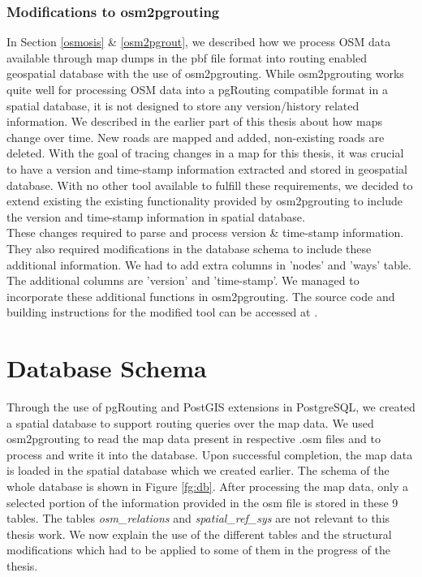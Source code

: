 \subsubsection{Modifications to osm2pgrouting} \label{modifications}
In Section \ref{osmosis} \& \ref{osm2pgrout}, we described how we process OSM data available through map dumps in the pbf file format into routing enabled geospatial database with the use of osm2pgrouting. While osm2pgrouting works quite well for processing OSM data into a pgRouting compatible format in a spatial database, it is not designed to store any version/history related information. We described in the earlier part of this thesis about how maps change over time. New roads are mapped and added, non-existing roads are deleted. With the goal of tracing changes in a map for this thesis, it was crucial to have a version and time-stamp information extracted and stored in geospatial database. With no other tool available to fulfill these requirements, we decided to extend existing the existing functionality provided by osm2pgrouting to include the version and time-stamp information in spatial database. \\

These changes required to parse and process version \& time-stamp information. They also required modifications in the database schema to include these additional information. We had to add extra columns in 'nodes' and 'ways' table. The additional columns are 'version' and 'time-stamp'. We managed to incorporate these additional functions in osm2pgrouting. The source code and building instructions for the modified tool can be accessed at \cite{sharma2016}. 
\section{Database Schema}\label{dbschema}
Through the use of pgRouting and PostGIS extensions in PostgreSQL, we created a spatial database to support routing queries over the map data. We used osm2pgrouting to read the map data present in respective .osm files and to process and write it into the database. Upon successful completion, the map data is loaded in the spatial database which we created earlier. The schema of the whole database is shown in Figure \ref{fg:db}. After processing the map data, only a selected portion of the information provided in the osm file is stored in these 9 tables. The tables \textit{osm{\_}relations} and \textit{spatial{\_}ref{\_}sys} are not relevant to this thesis work. We now explain the use of the different tables and the structural modifications which had to be applied to some of them in the progress of the thesis.

